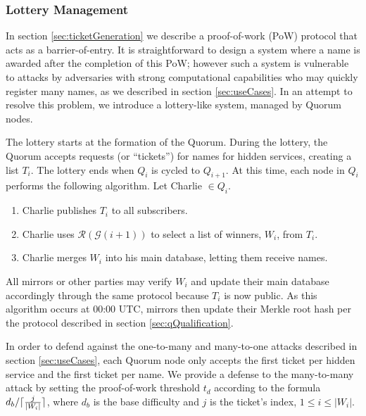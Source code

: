 \documentclass[USenglish,oneside,twocolumn]{article}
\DeclarePairedDelimiter{\ceil}{\lceil}{\rceil}
\newcommand*\nWinners{\left\vert{W_{i}}\right\vert}
\begin{document}
\subsubsection{Lottery Management}
\label{sec:lotteryManagement}

In section \ref{sec:ticketGeneration} we describe a proof-of-work (PoW) protocol that acts as a barrier-of-entry. It is straightforward to design a system where a name is awarded after the completion of this PoW; however such a system is vulnerable to attacks by adversaries with strong computational capabilities who may quickly register many names, as we described in section \ref{sec:useCases}. In an attempt to resolve this problem, we introduce a lottery-like system, managed by Quorum nodes.

The lottery starts at the formation of the Quorum. During the lottery, the Quorum accepts requests (or ``tickets'') for names for hidden services, creating a list $ T_{i} $. The lottery ends when $ Q_{i} $ is cycled to $ Q_{i + 1} $. At this time, each node in $ Q_{i} $ performs the following algorithm. Let Charlie $ \in Q_{i} $.

\begin{enumerate}
	\item Charlie publishes $ T_{i} $ to all subscribers.
	\item Charlie uses $ \mathcal{R}(\mathcal{G}(i + 1)) $ to select a list of winners, $ W_{i} $, from $ T_{i} $. 
	\item Charlie merges $ W_{i} $ into his main database, letting them receive names.
\end{enumerate}

All mirrors or other parties may verify $ W_{i} $ and update their main database accordingly through the same protocol because $ T_{i} $ is now public. As this algorithm occurs at 00:00 UTC, mirrors then update their Merkle root hash per the protocol described in section \ref{sec:qQualification}.

In order to defend against the one-to-many and many-to-one attacks described in section \ref{sec:useCases}, each Quorum node only accepts the first ticket per hidden service and the first ticket per name. We provide a defense to the many-to-many attack by setting the proof-of-work threshold $ t_{d} $ according to the formula $ d_{b} / \ceil{\frac{j}{\nWinners}} $, where $ d_{b} $ is the base difficulty and $ j $ is the ticket's index, $ 1 \leq i \leq \nWinners $.

%
%
\end{document}
